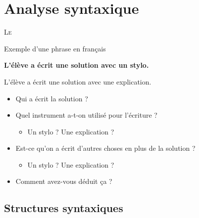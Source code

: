 \documentclass{KodeBook}
\begin{document}
		\mainmatter
	
\fi
\chapter{Analyse syntaxique}

\begin{introduction}
	\lettrine{L}{e} 
\end{introduction} 

\begin{exampleblock}{Exemple d'une phrase en français}
	\begin{center}
		\Large\bfseries
		L'élève a écrit une solution avec un stylo. 
		
		L'élève a écrit une solution avec une explication.
	\end{center}
\end{exampleblock}

\begin{itemize}
	\item Qui a écrit la solution ?
	\item Quel instrument a-t-on utilisé pour l'écriture ?
	\begin{itemize}
		\item Un stylo ? Une explication ?
	\end{itemize}
	\item Est-ce qu'on a écrit d'autres choses en plus de la solution ?
	\begin{itemize}
		\item Un stylo ? Une explication ?
	\end{itemize}
	\item Comment avez-vous déduit ça ?
\end{itemize}

\section{Structures syntaxiques}
\end{document}
